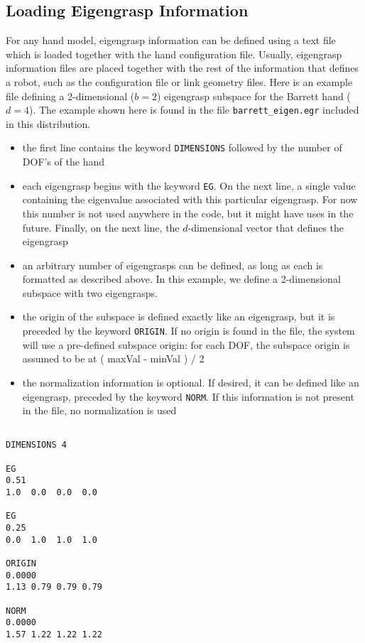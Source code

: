 \subsection{Loading Eigengrasp Information}

For any hand model, eigengrasp information can be defined using a text
file which is loaded together with the hand configuration
file. Usually, eigengrasp information files are placed together with
the rest of the information that defines a robot, such as the
configuration file or link geometry files. Here is an example file
defining a 2-dimensional ($b=2$) eigengrasp subspace for the Barrett
hand ($d=4$). The example shown here is found in the file
\texttt{barrett\_eigen.egr} included in this distribution.

\begin{itemize}
\item the first line contains the keyword \texttt{DIMENSIONS} followed
  by the number of DOF's of the hand
\item each eigengrasp begins with the keyword \texttt{EG}. On the next
  line, a single value containing the eigenvalue associated with this
  particular eigengrasp. For now this number is not used anywhere in
  the code, but it might have uses in the future. Finally, on the next
  line, the $d$-dimensional vector that defines the eigengrasp
\item an arbitrary number of eigengrasps can be defined, as long as
  each is formatted as described above. In this example, we define a
  2-dimensional subspace with two eigengrasps. 
\item the origin of the subspace is defined exactly like an
  eigengrasp, but it is preceded by the keyword \texttt{ORIGIN}. If
  no origin is found in the file, the system will use a pre-defined
  subspace origin: for each DOF, the subspace origin is assumed to be
  at ( maxVal - minVal ) / 2
\item the normalization information is optional. If desired, it can be
  defined like an eigengrasp, preceded by the keyword
  \texttt{NORM}. If this information is not present in the file, no
  normalization is used
\end{itemize}

\begin{verbatim}

DIMENSIONS 4

EG
0.51
1.0  0.0  0.0  0.0

EG
0.25
0.0  1.0  1.0  1.0 

ORIGIN
0.0000
1.13 0.79 0.79 0.79

NORM
0.0000
1.57 1.22 1.22 1.22
\end{verbatim}

